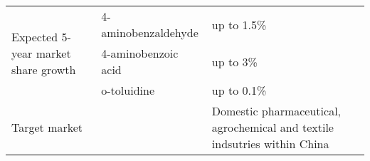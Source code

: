 \begin{landscape}
\begin{table}[h]
\begin{tabular}{@{}lll@{}}
\multirow{3}{*}{Expected 5-year market share growth} & 4-aminobenzaldehyde & up to 1.5\%                                                                                                                                                                                                                                                                                                                                                                                                           \\ \cmidrule(l){2-3} 
                                                     & 4-aminobenzoic acid & up to 3\%                                                                                                                                                                                                                                                                                                                                                                                                             \\ \cmidrule(l){2-3} 
                                                     & o-toluidine         & up to 0.1\%                                                                                                                                                                                                                                                                                                                                                                                                           \\ \midrule
\multicolumn{2}{l}{Target market}                                        & Domestic pharmaceutical, agrochemical and textile indsutries within China                                                                                                                                                                                                                                                                                                                                             \\ \bottomrule
\end{tabular}
\end{table}

\end{landscape}